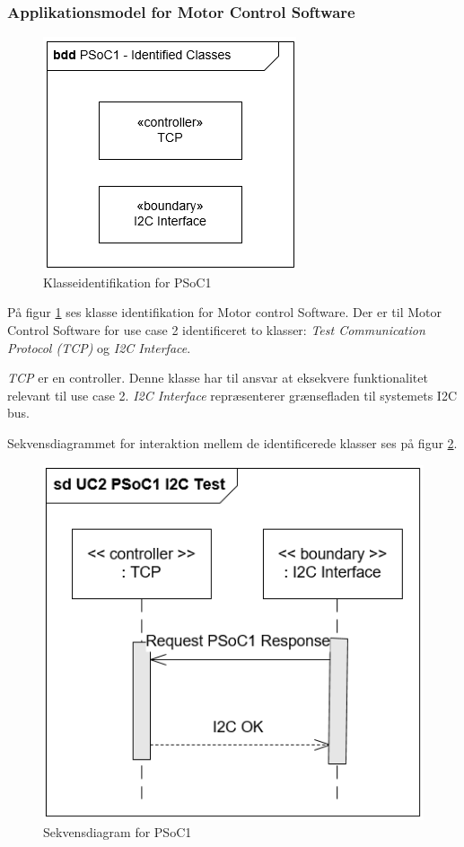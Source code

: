 \subsubsection{Applikationsmodel for Motor Control Software}

\begin{figure}[H]
	\centering
	\includegraphics[scale=0.8]{Systemarkitektur/images/KlasseIdentifikationPSoC1.png}
	\caption{Klasseidentifikation for PSoC1}
	\label{fig:klasseidentifikationPSoC1}
\end{figure}

På figur \ref{fig:klasseidentifikationPSoC1} ses klasse identifikation for Motor control Software. Der er til Motor Control Software for use case 2 identificeret to klasser: 
\textit{Test Communication Protocol (TCP)} og \textit{I2C Interface}.

\textit{TCP} er en controller. Denne klasse har til ansvar at eksekvere funktionalitet relevant til use case 2. \textit{I2C Interface} repræsenterer grænsefladen til systemets I2C bus.

Sekvensdiagrammet for interaktion mellem de identificerede klasser ses på figur \ref{fig:sekvensPSoC1I2CTest}.

\begin{figure}[H]
	\centering
	\includegraphics[width=.8\textwidth] {Systemarkitektur/images/SDPSoC1I2CTest}
	\caption{Sekvensdiagram for PSoC1}
	\label{fig:sekvensPSoC1I2CTest}
\end{figure}

